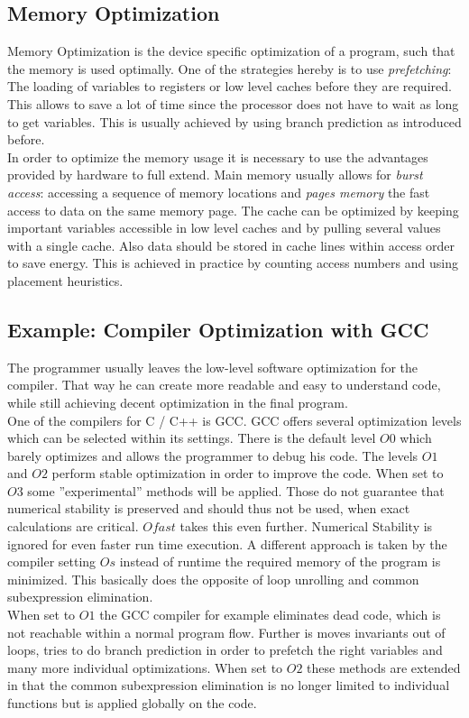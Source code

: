 \documentclass[12pt, a4paper]{article}
\begin{document}
\subsection{Memory Optimization}
Memory Optimization is the device specific optimization of a program, such that the memory is used optimally. One of the strategies hereby is to use \textit{prefetching}: The loading of variables to registers or low level caches before they are required. This allows to save a lot of time since the processor does not have to wait as long to get variables. This is usually achieved by using branch prediction as introduced before. \\
In order to optimize the memory usage it is necessary to use the advantages provided by hardware to full extend. Main memory usually allows for \textit{burst access}: accessing a sequence of memory locations and \textit{pages memory} the fast access to data on the same memory page. The cache can be optimized by keeping important variables accessible in low level caches and by pulling several values with a single cache. Also data should be stored in cache lines within access order to save energy. This is achieved in practice by counting access numbers and using placement heuristics.

\subsection{Example: Compiler Optimization with GCC}
The programmer usually leaves the low-level software optimization for the compiler. That way he can create more readable and easy to understand code, while still achieving decent optimization in the final program. \\
One of the compilers for C / C++ is GCC. GCC offers several optimization levels which can be selected within its settings. There is the default level $O0$ which barely optimizes and allows the programmer to debug his code. The levels $O1$ and $O2$ perform stable optimization in order to improve the code. When set to $O3$ some ''experimental'' methods will be applied. Those do not guarantee that numerical stability is preserved and should thus not be used, when exact calculations are critical. $Ofast$ takes this even further. Numerical Stability is ignored for even faster run time execution. A different approach is taken by the compiler setting $Os$ instead of runtime the required memory of the program is minimized. This basically does the opposite of loop unrolling and common subexpression elimination. \\
When set to $O1$ the GCC compiler for example eliminates dead code, which is not reachable within a normal program flow. Further is moves invariants out of loops, tries to do branch prediction in order to prefetch the right variables and many more individual optimizations. When set to $O2$ these methods are extended in that the common subexpression elimination is no longer limited to individual functions but is applied globally on the code. \\
\end{document}
